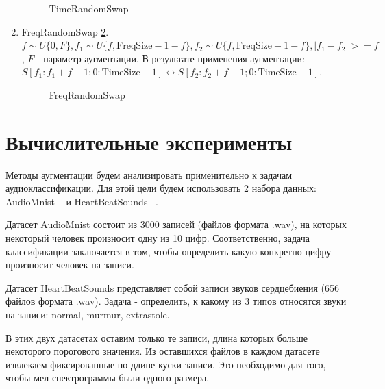 \documentclass[12pt, fleqn]{article}
\begin{document}
\begin{enumerate}
\begin{figure}[h]
			\caption{TimeRandomSwap}
			\label{fig:i3}
		\end{figure}
		\item FreqRandomSwap \ref{fig:i18}. \newline
		$f \sim U\{0, F\}, f_1 \sim U\{f, \text{FreqSize} - 1 - f\}, f_2 \sim U\{f, \text{FreqSize} - 1 - f\}, |f_1 - f_2| >= f $, $F$ - параметр аугментации. \newline 
		В результате применения аугментации: \newline
		$S[f_1: f_1 + f - 1; 0:\text{TimeSize} - 1] \leftrightarrow S[f_2 : f_2 + f - 1; 0:\text{TimeSize} - 1]$.
		\begin{figure}[h]
			\caption{FreqRandomSwap}
			\label{fig:i18}
		\end{figure}
	\end{enumerate}

	\section{Вычислительные эксперименты}
	
	Методы аугментации будем анализировать применительно к задачам аудиоклассификации. Для этой цели будем использовать 2 набора данных: AudioMnist ~\cite{b7} и HeartBeatSounds ~\cite{b6}. 
	
	Датасет AudioMnist состоит из 3000 записей (файлов формата .wav), на которых некоторый человек произносит одну из 10 цифр. Соответственно, задача классификации заключается в том, чтобы определить какую конкретно цифру произносит человек на записи.
	
	Датасет HeartBeatSounds представляет собой записи звуков сердцебиения (656 файлов формата .wav). Задача - определить, к какому из 3 типов относятся звуки на записи: normal, murmur, extrastole.  
	
	В этих двух датасетах оставим только те записи, длина которых больше некоторого порогового значения. Из оставшихся файлов в каждом датасете извлекаем фиксированные по длине куски записи. Это необходимо для того, чтобы мел-спектрограммы были одного размера. 
	
\end{document}
